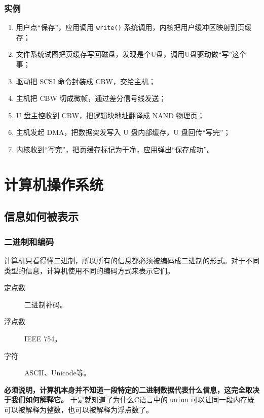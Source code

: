 \documentclass[fontset=none,aspectratio=1610]{ctexbeamer}
\begin{document}
\begin{frame}
    \frametitle{实例}

\begin{enumerate}
\item 用户点“保存”，应用调用 \texttt{write()} 系统调用，内核把用户缓冲区映射到页缓存；
\item 文件系统试图把页缓存写回磁盘，发现是个U盘，调用U盘驱动做“写”这个事；
\item 驱动把 SCSI 命令封装成 CBW，交给主机；
\item 主机把 CBW 切成微帧，通过差分信号线发送；
\item U 盘主控收到 CBW，把逻辑块地址翻译成 NAND 物理页；
\item 主机发起 DMA，把数据突发写入 U 盘内部缓存，U 盘回传“写完”；
\item 内核收到“写完”，把页缓存标记为干净，应用弹出“保存成功”。
\end{enumerate}

\end{frame}

\section{计算机操作系统}

\subsection{信息如何被表示}

\begin{frame}
    \frametitle{二进制和编码}

    计算机只看得懂二进制，所以所有的信息都必须被编码成二进制的形式。对于不同类型的信息，计算机使用不同的编码方式来表示它们。

    \begin{description}
        \item[定点数] 二进制补码。
        \item[浮点数] IEEE 754。
        \item[字符] ASCII、Unicode等。 
    \end{description}

    \textbf{必须说明，计算机本身并不知道一段特定的二进制数据代表什么信息，这完全取决于我们如何解释它。} 于是就知道了为什么C语言中的 \texttt{union} 可以让同一段内存既可以被解释为整数，也可以被解释为浮点数了。

\end{frame}
\end{document}
